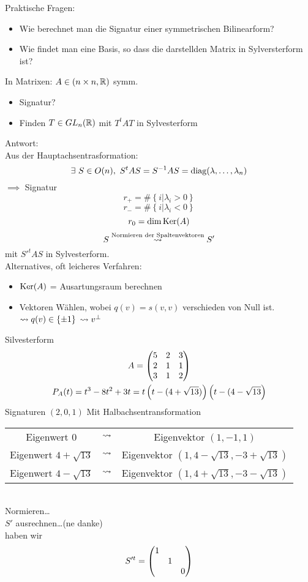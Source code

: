 \begin{Bem}
  Praktische Fragen:
  \begin{itemize}
    \item Wie berechnet man die Signatur einer symmetrischen Bilinearform?
    \item Wie findet man eine Basis, so dass die darstellden Matrix in Sylversterform ist?
  \end{itemize}
  In Matrixen: $A\in(n\times n, \mathbb{R})$ symm.
  \begin{itemize}
    \item Signatur?
    \item Finden $T\in GL_n(\mathbb{R})$ mit $T^tAT$ in Sylvesterform
  \end{itemize}
  Antwort:\\
  Aus der Hauptachsentrasformation:
  \[\exists\ S\in O(n),\ S^tAS=S^{-1}AS=\diag(\lambda,\dots,\lambda_n)\]
  $\implies$ Signatur
  \[r_+=\#\left\{ i|\lambda_i>0 \right\}\]
  \[r_-=\#\left\{ i|\lambda_i<0 \right\}\]
  \[r_0=\dim\operatorname{Ker}(A)\]
  \[S\stackrel{\text{Normieren der Spaltenvektoren}}{\rightsquigarrow}S'\]
  mit $S'^tAS$ in Sylvesterform.\\
  Alternatives, oft leicheres Verfahren:
  \begin{itemize}
    \item $\operatorname{Ker}(A)$ = Ausartungsraum berechnen
    \item Vektoren Wählen, wobei $q(v)=s(v,v)$ verschieden von Null ist. $\rightsquigarrow q(v)\in\left\{ \pm 1 \right\}$ $\rightsquigarrow v^\perp$
  \end{itemize}
\end{Bem}
\begin{Bsp}{Silvesterform}
  \begin{gather*}
    A=\begin{pmatrix}5&2&3\\ 2&1&1\\ 3&1&2\end{pmatrix}\\
    P_A(t)=t^3-8t^2+3t=t\left(t-(4+\sqrt{13})\right)\left( t-(4-\sqrt{13} \right)\\
  \end{gather*}
  Signaturen $(2,0,1)$
  Mit Halbachsentransformation\\
  \begin{tabular}{ccc}
    Eigenwert 0&$\rightsquigarrow$&Eigenvektor $(1,-1,1)$\\
    Eigenwert $4+\sqrt{13}$ & $\rightsquigarrow$ & Eigenvektor $(1,4-\sqrt{13},-3+\sqrt{13})$\\
    Eigenwert $4-\sqrt{13}$ & $\rightsquigarrow$ & Eigenvektor $(1,4+\sqrt{13},-3-\sqrt{13})$
  \end{tabular}\\
  Normieren\dots\\
  $S'$ ausrechnen\dots (ne danke)\\
  haben wir 
  \[S'^t=\begin{pmatrix}1&&\\&1&\\&&0\end{pmatrix}\]
\end{Bsp}
